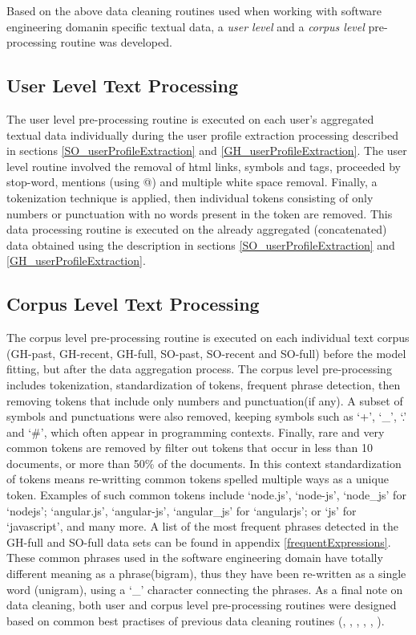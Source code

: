     Based on the above data cleaning routines used when working with software engineering domanin specific textual data, a \emph{user level} and a \emph{corpus level} pre-processing routine was developed. 
    
    \subsection{User Level Text Processing}
    
        The user level pre-processing routine is executed on each user's aggregated textual data individually during the user profile extraction processing described in sections \ref{SO_userProfileExtraction} and \ref{GH_userProfileExtraction}. The user level routine involved the removal of html links, symbols and tags, proceeded by stop-word, mentions (using @) and multiple white space removal. Finally, a tokenization technique is applied, then individual tokens consisting of only numbers or punctuation with no words present in the token are removed. This data processing routine is executed on the already aggregated (concatenated) data obtained using the description in sections \ref{SO_userProfileExtraction} and \ref{GH_userProfileExtraction}.
        
    \subsection{Corpus Level Text Processing}
    
        The corpus level pre-processing routine is executed on each individual text corpus (GH-past, GH-recent, GH-full, SO-past, SO-recent and SO-full) before the model fitting, but after the data aggregation process. The corpus level pre-processing includes tokenization, standardization of tokens, frequent phrase detection, then removing tokens that include only numbers and punctuation(if any). A subset of symbols and punctuations were also removed, keeping symbols such as ‘+’, ‘\_’, ‘.’ and ‘\#’, which often appear in programming contexts. Finally, rare and very common tokens are removed by filter out tokens that occur in less than 10 documents, or more than 50\% of the documents. In this context standardization of tokens means re-writting common tokens spelled multiple ways as a unique token. Examples of such common tokens include ‘node.js’, ‘node-js’, ‘node\_js’ for ‘nodejs’; ‘angular.js’, ‘angular-js’, ‘angular\_js’ for ‘angularjs’; or ‘js’ for ‘javascript’, and many more. A list of the most frequent phrases detected in the GH-full and SO-full data sets can be found in appendix \ref{frequentExpressions}. These common phrases used in the software engineering domain have totally different meaning as a phrase(bigram), thus they have been re-written as a single word (unigram), using a ‘\_’ character connecting the phrases. As a final note on data cleaning, both user and corpus level pre-processing routines were designed based on common best practises of previous data cleaning routines (\cite{tian2013predicting}, \cite{campbell2015latent}, \cite{treude2019predicting}, \cite{efstathiou2018word}, \cite{boyd2014care}, \cite{liao2019status}).

